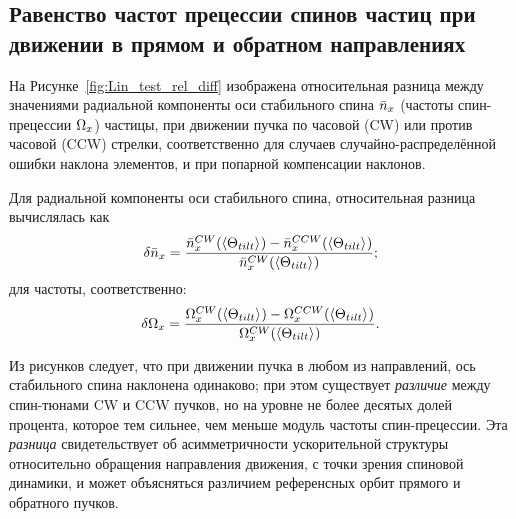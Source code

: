 \subsection{Равенство частот прецессии спинов частиц при движении в прямом и обратном направлениях}\label{chpt3:imperfections:CW_vs_CCW}
На Рисунке~\ref{fig:Lin_test_rel_diff} изображена относительная разница между значениями
радиальной компоненты оси стабильного спина $\bar n_x$ (частоты спин-прецессии $\Omega_x$) частицы, 
при движении пучка по часовой (CW) или против часовой (CCW) стрелки, соответственно для случаев 
случайно-распределённой ошибки наклона элементов, и при попарной компенсации наклонов.

Для радиальной компоненты оси стабильного спина, относительная разница вычислялась как 
\[
\delta\nbar_x = \frac{\nbar_x^{CW}(\avg{\Theta_{tilt}}) - \nbar_x^{CCW}(\avg{\Theta_{tilt}})}{\nbar_x^{CW}(\avg{\Theta_{tilt}})};
\]
для частоты, соответственно:
\[
\delta\W_x = \frac{\W_x^{CW}(\avg{\Theta_{tilt}}) - \W_x^{CCW}(\avg{\Theta_{tilt}})}{\W_x^{CW}(\avg{\Theta_{tilt}})}.
\]

Из рисунков следует, что при движении пучка в любом из направлений, ось стабильного спина 
наклонена одинаково; при этом существует \emph{различие} между спин-тюнами CW и CCW пучков, но 
на уровне не более десятых долей процента, которое тем сильнее, чем меньше модуль частоты спин-прецессии. 
Эта \emph{разница}  свидетельствует об асимметричности ускорительной структуры 
относительно обращения направления движения, с точки зрения спиновой динамики, 
и может объясняться различием референсных орбит прямого и обратного пучков. 

